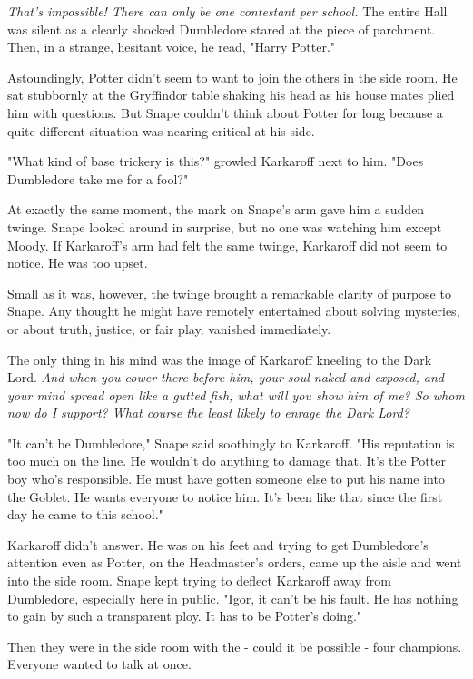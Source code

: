 \emph{That's impossible! There can only be one contestant per school.} The entire Hall was silent as a clearly shocked Dumbledore stared at the piece of parchment. Then, in a strange, hesitant voice, he read, "Harry Potter."

Astoundingly, Potter didn't seem to want to join the others in the side room. He sat stubbornly at the Gryffindor table shaking his head as his house mates plied him with questions. But Snape couldn't think about Potter for long because a quite different situation was nearing critical at his side.

"What kind of base trickery is this?" growled Karkaroff next to him. "Does Dumbledore take me for a fool?"

At exactly the same moment, the mark on Snape's arm gave him a sudden twinge. Snape looked around in surprise, but no one was watching him except Moody. If Karkaroff's arm had felt the same twinge, Karkaroff did not seem to notice. He was too upset.

Small as it was, however, the twinge brought a remarkable clarity of purpose to Snape. Any thought he might have remotely entertained about solving mysteries, or about truth, justice, or fair play, vanished immediately.

The only thing in his mind was the image of Karkaroff kneeling to the Dark Lord. \emph{And when you cower there before him, your soul naked and exposed, and your mind spread open like a gutted fish, what will you show him of me? So whom now do I support? What course the least likely to enrage the Dark Lord?}

"It can't be Dumbledore," Snape said soothingly to Karkaroff. "His reputation is too much on the line. He wouldn't do anything to damage that. It's the Potter boy who's responsible. He must have gotten someone else to put his name into the Goblet. He wants everyone to notice him. It's been like that since the first day he came to this school."

Karkaroff didn't answer. He was on his feet and trying to get Dumbledore's attention even as Potter, on the Headmaster's orders, came up the aisle and went into the side room. Snape kept trying to deflect Karkaroff away from Dumbledore, especially here in public. "Igor, it can't be his fault. He has nothing to gain by such a transparent ploy. It has to be Potter's doing."

Then they were in the side room with the - could it be possible - four champions. Everyone wanted to talk at once.

